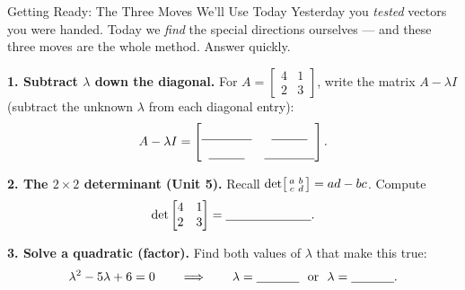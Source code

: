 \documentclass[10pt]{article}
\begin{document}
\namedateperiod

\vspace{0.12in}

\begin{notesbox}{Getting Ready: The Three Moves We'll Use Today}
\small Yesterday you \emph{tested} vectors you were handed. Today we \emph{find} the special
directions ourselves --- and these three moves are the whole method. Answer quickly.

\vspace{4pt}
\textbf{1. Subtract $\lambda$ down the diagonal.} For $A=\begin{bmatrix} 4 & 1 \\ 2 & 3 \end{bmatrix}$,
write the matrix $A-\lambda I$ (subtract the unknown $\lambda$ from each diagonal entry):
\[
  A-\lambda I=\begin{bmatrix}\rule{0pt}{1.2em}\blank{1.4cm} & \blank{1.0cm}\\[3pt]\blank{1.0cm} & \blank{1.4cm}\end{bmatrix}.
\]

\vspace{4pt}
\textbf{2. The $2\times2$ determinant (Unit 5).} Recall $\det\begin{bsmallmatrix} a & b \\ c & d
\end{bsmallmatrix}=ad-bc$. Compute
\[
  \det\begin{bmatrix} 4 & 1 \\ 2 & 3 \end{bmatrix} = \blank{2.4cm}.
\]

\vspace{4pt}
\textbf{3. Solve a quadratic (factor).} Find both values of $\lambda$ that make this true:
\[
  \lambda^2-5\lambda+6=0 \qquad\Longrightarrow\qquad \lambda=\blank{1.2cm}\ \text{ or }\ \lambda=\blank{1.2cm}.
\]
\end{notesbox}
\end{document}
